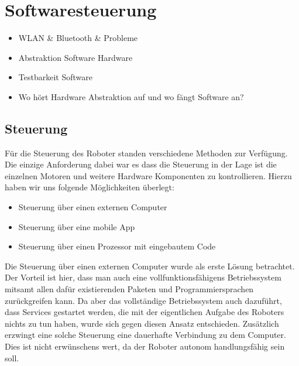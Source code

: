 \documentclass[conference,compsoc,final,a4paper]{IEEEtran}
\begin{document}
\section{Softwaresteuerung}

\begin{itemize}
  \item WLAN & Bluetooth & Probleme
  \item Abstraktion Software Hardware
  \item Testbarkeit Software
  \item Wo hört Hardware Abstraktion auf und wo fängt Software an?
\end{itemize}

\subsection{Steuerung}

Für die Steuerung des Roboter standen verschiedene Methoden zur Verfügung. Die einzige Anforderung dabei
war es dass die Steuerung in der Lage ist die einzelnen Motoren und weitere Hardware Komponenten
zu kontrollieren. Hierzu haben wir uns folgende Möglichkeiten überlegt:

\begin{itemize}
  \item Steuerung über einen externen Computer
  \item Steuerung über eine mobile App
  \item Steuerung über einen Prozessor mit eingebautem Code
\end{itemize}

Die Steuerung über einen externen Computer wurde als erste Lösung betrachtet. Der Vorteil
ist hier, dass man auch eine vollfunktionsfähigens Betriebssystem mitsamt allen dafür existierenden
Paketen und Programmiersprachen zurückgreifen kann. Da aber das vollständige Betriebssystem auch
dazuführt, dass Services gestartet werden, die mit der eigentlichen Aufgabe des Roboters nichts zu
tun haben, wurde sich gegen diesen Ansatz entschieden. Zusätzlich erzwingt eine solche Steuerung
eine dauerhafte Verbindung zu dem Computer. Dies ist nicht erwünschens wert, da der Roboter autonom
handlungsfähig sein soll.
\end{document}
